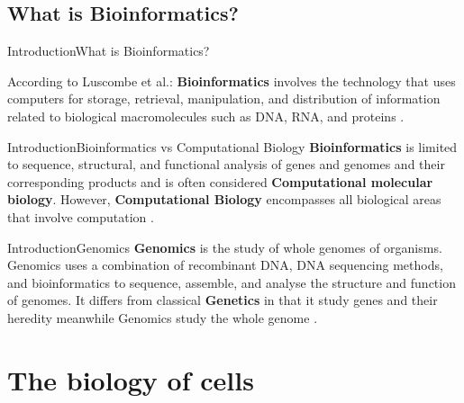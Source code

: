 \documentclass[10pt]{beamer}
\begin{document}
{%
\subsection{What is Bioinformatics?}

\begin{frame}{Introduction}{What is Bioinformatics?}

    According to Luscombe et al.: \textbf{Bioinformatics} involves the technology that uses computers for storage, retrieval, manipulation, and distribution of information related to biological macromolecules such as DNA, RNA, and proteins \cite{luscombe2001bioinformatics}.

\end{frame}

\begin{frame}{Introduction}{Bioinformatics vs Computational Biology}
\textbf{Bioinformatics} is limited to sequence, structural, and functional analysis of genes and genomes and their corresponding products and is often considered \textbf{Computational
molecular biology}. However, \textbf{Computational Biology} encompasses all biological areas that involve computation \cite{xiong2006essential}.
\end{frame}

\begin{frame}{Introduction}{Genomics}
\textbf{Genomics} is the study of whole genomes of organisms. Genomics uses a combination of recombinant DNA, DNA sequencing methods, and bioinformatics to sequence, assemble, and analyse the structure and function of genomes. It differs from classical \textbf{Genetics} in that it study genes and their heredity meanwhile Genomics study the whole genome  \cite{archibald2018genomics}.
\end{frame}


\section{The biology of cells}


}
\end{document}
